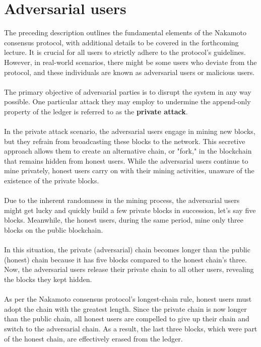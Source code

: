 \documentclass{report}
\begin{document}
\section{Adversarial users}
The preceding description outlines the fundamental elements of the Nakamoto consensus protocol, with additional details to be covered in the forthcoming lecture. It is crucial for all users to strictly adhere to the protocol's guidelines. However, in real-world scenarios, there might be some users who deviate from the protocol, and these individuals are known as adversarial users or malicious users.\\\\
The primary objective of adversarial parties is to disrupt the system in any way possible. One particular attack they may employ to undermine the append-only property of the ledger is referred to as the \textbf{private attack}.\\\\
In the private attack scenario, the adversarial users engage in mining new blocks, but they refrain from broadcasting these blocks to the network. This secretive approach allows them to create an alternative chain, or "fork," in the blockchain that remains hidden from honest users. While the adversarial users continue to mine privately, honest users carry on with their mining activities, unaware of the existence of the private blocks.\\\\
Due to the inherent randomness in the mining process, the adversarial users might get lucky and quickly build a few private blocks in succession, let's say five blocks. Meanwhile, the honest users, during the same period, mine only three blocks on the public blockchain.\\\\
In this situation, the private (adversarial) chain becomes longer than the public (honest) chain because it has five blocks compared to the honest chain's three. Now, the adversarial users release their private chain to all other users, revealing the blocks they kept hidden.\\\\
As per the Nakamoto consensus protocol's longest-chain rule, honest users must adopt the chain with the greatest length. Since the private chain is now longer than the public chain, all honest users are compelled to give up their chain and switch to the adversarial chain. As a result, the last three blocks, which were part of the honest chain, are effectively erased from the ledger.\\\\
\end{document}
